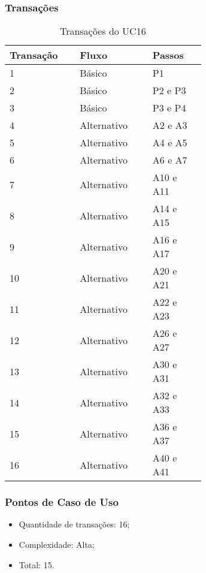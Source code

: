   \subsubsection{Transações}

  \begin{table*}[!h]
  \centering
  \caption{Transações do UC16}
  \label{Rotulo}
    \begin{tabular}{|p{0.20\linewidth}|p{0.25\linewidth}|p{0.20\linewidth}|}
    \hline
    \textbf{Transação} & \textbf{Fluxo} & \textbf{Passos} \\ 
    \hline
    1 & Básico & P1\\
    \hline
    2 & Básico & P2 e P3\\
    \hline
    3 & Básico & P3 e P4\\
    \hline
    4 & Alternativo & A2 e A3\\
    \hline
    5 & Alternativo & A4 e A5\\
    \hline
    6 & Alternativo & A6 e A7\\
    \hline
    7 & Alternativo & A10 e A11\\
    \hline
    8 & Alternativo & A14 e A15\\
    \hline
    9 & Alternativo & A16 e A17\\
    \hline
    10 & Alternativo & A20 e A21\\
    \hline
    11 & Alternativo & A22 e A23\\
    \hline
    12 & Alternativo & A26 e A27\\
    \hline
    13 & Alternativo & A30 e A31\\
    \hline
    14 & Alternativo & A32 e A33\\
    \hline
    15 & Alternativo & A36 e A37\\
    \hline
    16 & Alternativo & A40 e A41\\
    \hline
    \end{tabular}
  \end{table*}

  \subsubsection{Pontos de Caso de Uso}

  \begin{itemize}
  \item Quantidade de transações: 16;
  \item Complexidade: Alta;
  \item Total: 15.
  \end{itemize}

